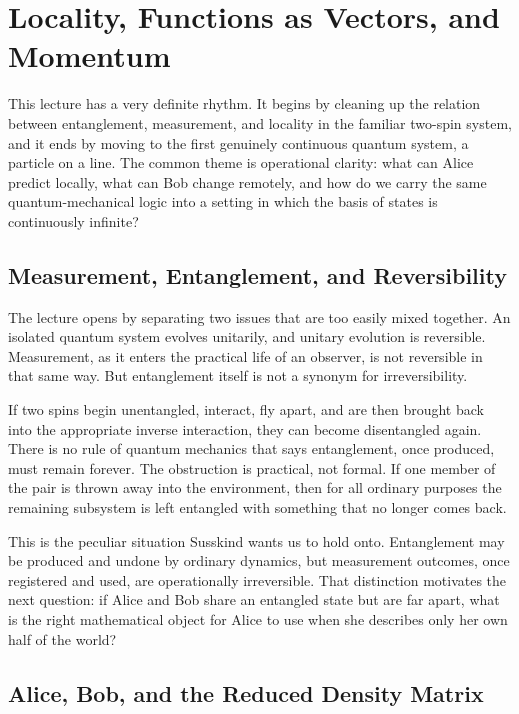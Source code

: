 \chapter{Locality, Functions as Vectors, and Momentum}

This lecture has a very definite rhythm. It begins by cleaning up the relation between entanglement, measurement, and locality in the familiar two-spin system, and it ends by moving to the first genuinely continuous quantum system, a particle on a line. The common theme is operational clarity: what can Alice predict locally, what can Bob change remotely, and how do we carry the same quantum-mechanical logic into a setting in which the basis of states is continuously infinite?

\section{Measurement, Entanglement, and Reversibility}

The lecture opens by separating two issues that are too easily mixed together. An isolated quantum system evolves unitarily, and unitary evolution is reversible. Measurement, as it enters the practical life of an observer, is not reversible in that same way. But entanglement itself is not a synonym for irreversibility.

If two spins begin unentangled, interact, fly apart, and are then brought back into the appropriate inverse interaction, they can become disentangled again. There is no rule of quantum mechanics that says entanglement, once produced, must remain forever. The obstruction is practical, not formal. If one member of the pair is thrown away into the environment, then for all ordinary purposes the remaining subsystem is left entangled with something that no longer comes back.

This is the peculiar situation Susskind wants us to hold onto. Entanglement may be produced and undone by ordinary dynamics, but measurement outcomes, once registered and used, are operationally irreversible. That distinction motivates the next question: if Alice and Bob share an entangled state but are far apart, what is the right mathematical object for Alice to use when she describes only her own half of the world?

\section{Alice, Bob, and the Reduced Density Matrix}

